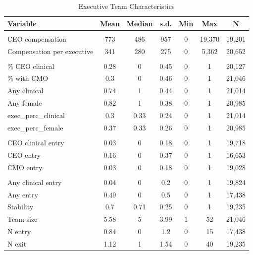 \begin{table}[!h]
\centering
\caption{Executive Team Characteristics\label{tab:exec_table}}
\centering
\begin{tabular}[t]{lcccccc}
\toprule
Variable & Mean & Median & s.d. & Min & Max & N\\
\midrule
\addlinespace[0.3em]
\multicolumn{7}{l}{\textbf{Compensation (2010 USD, \$000s)}}\\
\hspace{1em}CEO compensation & 773 & 486 & 957 & 0 & 19,370 & 19,201\\
\hspace{1em}Compensation per executive & 341 & 280 & 275 & 0 & 5,362 & 20,652\\
\addlinespace[0.3em]
\multicolumn{7}{l}{\textbf{Composition}}\\
\hspace{1em}\% CEO clinical & 0.28 & 0 & 0.45 & 0 & 1 & 20,127\\
\hspace{1em}\% with CMO & 0.3 & 0 & 0.46 & 0 & 1 & 21,046\\
\hspace{1em}Any clinical & 0.74 & 1 & 0.44 & 0 & 1 & 21,014\\
\hspace{1em}Any female & 0.82 & 1 & 0.38 & 0 & 1 & 20,985\\
\hspace{1em}exec\_perc\_clinical & 0.3 & 0.33 & 0.24 & 0 & 1 & 21,014\\
\hspace{1em}exec\_perc\_female & 0.37 & 0.33 & 0.26 & 0 & 1 & 20,985\\
\addlinespace[0.3em]
\multicolumn{7}{l}{\textbf{Turnover}}\\
\hspace{1em}CEO clinical entry & 0.03 & 0 & 0.18 & 0 & 1 & 19,718\\
\hspace{1em}CEO entry & 0.16 & 0 & 0.37 & 0 & 1 & 16,653\\
\hspace{1em}CMO entry & 0.03 & 0 & 0.18 & 0 & 1 & 19,028\\
\addlinespace[0.3em]
\multicolumn{7}{l}{\textbf{Team}}\\
\hspace{1em}Any clinical entry & 0.04 & 0 & 0.2 & 0 & 1 & 19,824\\
\hspace{1em}Any entry & 0.49 & 0 & 0.5 & 0 & 1 & 17,438\\
\hspace{1em}Stability & 0.7 & 0.71 & 0.25 & 0 & 1 & 19,235\\
\hspace{1em}Team size & 5.58 & 5 & 3.99 & 1 & 52 & 21,046\\
\hspace{1em}N entry & 0.84 & 0 & 1.2 & 0 & 15 & 17,438\\
\hspace{1em}N exit & 1.12 & 1 & 1.54 & 0 & 40 & 19,235\\
\bottomrule
\end{tabular}
\end{table}
